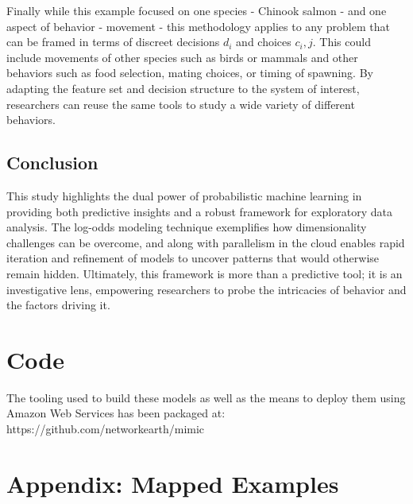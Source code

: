 \documentclass[11pt]{article}
\begin{document}
Finally while this example focused on one species - Chinook salmon - and one aspect of behavior - movement - this methodology applies to any problem that can be framed in terms of discreet decisions $d_i$ and choices $c_i,j$. This could include movements of other species such as birds or mammals and other behaviors such as food selection, mating choices, or timing of spawning. By adapting the feature set and decision structure to the system of interest, researchers can reuse the same tools to study a wide variety of different behaviors. 


\subsection*{Conclusion}

This study highlights the dual power of probabilistic machine learning in providing both predictive insights and a robust framework for exploratory data analysis. The log-odds modeling technique exemplifies how dimensionality challenges can be overcome, and along with parallelism in the cloud enables rapid iteration and refinement of models to uncover patterns that would otherwise remain hidden. Ultimately, this framework is more than a predictive tool; it is an investigative lens, empowering researchers to probe the intricacies of behavior and the factors driving it. 


\newpage

\section*{Code}

The tooling used to build these models as well as the means to deploy them using Amazon Web Services has been packaged at: \newline https://github.com/networkearth/mimic



\newpage
\section*{Appendix: Mapped Examples}
\end{document}
